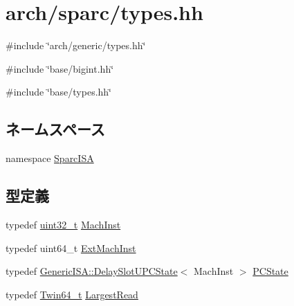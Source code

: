 \hypertarget{arch_2sparc_2types_8hh}{
\section{arch/sparc/types.hh}
\label{arch_2sparc_2types_8hh}
}
{\ttfamily \#include \char`\"{}arch/generic/types.hh\char`\"{}}\par
{\ttfamily \#include \char`\"{}base/bigint.hh\char`\"{}}\par
{\ttfamily \#include \char`\"{}base/types.hh\char`\"{}}\par
\subsection*{ネームスペース}
\begin{DoxyCompactItemize}
\item 
namespace \hyperlink{namespaceSparcISA}{SparcISA}
\end{DoxyCompactItemize}
\subsection*{型定義}
\begin{DoxyCompactItemize}
\item 
typedef \hyperlink{Type_8hh_a435d1572bf3f880d55459d9805097f62}{uint32\_\-t} \hyperlink{namespaceSparcISA_a301c22ea09fa33dcfe6ddf22f203699c}{MachInst}
\item 
typedef uint64\_\-t \hyperlink{namespaceSparcISA_aec686c38e40c7f794f1435591c15c275}{ExtMachInst}
\item 
typedef \hyperlink{classGenericISA_1_1DelaySlotUPCState}{GenericISA::DelaySlotUPCState}$<$ MachInst $>$ \hyperlink{namespaceSparcISA_ad2dd2c09ea20fdef260773e5cb128f93}{PCState}
\item 
typedef \hyperlink{structm5__twin64__t}{Twin64\_\-t} \hyperlink{namespaceSparcISA_aca26dbbb6d5074318b8557e012e98a34}{LargestRead}
\end{DoxyCompactItemize}
